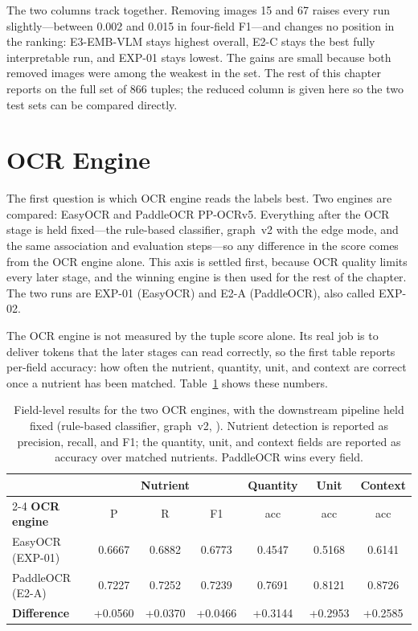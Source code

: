 The two columns track together. Removing images 15 and 67 raises every run
slightly---between 0.002 and 0.015 in four-field F1---and changes no
position in the ranking: E3-EMB-VLM stays highest overall, E2-C stays the
best fully interpretable run, and EXP-01 stays lowest. The gains are small
because both removed images were among the weakest in the set. The rest of
this chapter reports on the full set of 866 tuples; the reduced column is
given here so the two test sets can be compared directly.

\section{OCR Engine}\label{sec:exp-ocr}

The first question is which OCR engine reads the labels best. Two engines
are compared: EasyOCR and PaddleOCR PP-OCRv5. Everything after the OCR
stage is held fixed---the rule-based classifier, graph~v2 with the
 edge mode, and the same association and evaluation
steps---so any difference in the score comes from the OCR engine alone.
This axis is settled first, because OCR quality limits every later stage,
and the winning engine is then used for the rest of the chapter. The two
runs are EXP-01 (EasyOCR) and E2-A (PaddleOCR), also called EXP-02.

The OCR engine is not measured by the tuple score alone. Its real job is
to deliver tokens that the later stages can read correctly, so the first
table reports per-field accuracy: how often the nutrient, quantity, unit,
and context are correct once a nutrient has been matched.
Table~\ref{tab:ocr-fields} shows these numbers.

\begin{table}[htbp]
  \centering
  \caption[OCR axis: field-level results]{Field-level results for the two
    OCR engines, with the downstream pipeline held fixed (rule-based
    classifier, graph~v2, ). Nutrient detection is reported
    as precision, recall, and F1; the quantity, unit, and context fields
    are reported as accuracy over matched nutrients. PaddleOCR wins every
    field.}
  \label{tab:ocr-fields}
  \small
  \begin{tabular}{@{}lcccccc@{}}
    \toprule
     & \multicolumn{3}{c}{\textbf{Nutrient}} & \textbf{Quantity} & \textbf{Unit} & \textbf{Context} \\
    \cmidrule(lr){2-4}
    \textbf{OCR engine} & P & R & F1 & acc & acc & acc \\
    \midrule
    EasyOCR (EXP-01)    & 0.6667 & 0.6882 & 0.6773 & 0.4547 & 0.5168 & 0.6141 \\
    PaddleOCR (E2-A)    & 0.7227 & 0.7252 & 0.7239 & 0.7691 & 0.8121 & 0.8726 \\
    \addlinespace
    \textbf{Difference} & +0.0560 & +0.0370 & +0.0466 & +0.3144 & +0.2953 & +0.2585 \\
    \bottomrule
  \end{tabular}
\end{table}

